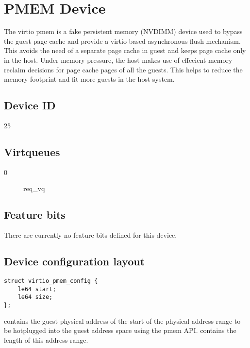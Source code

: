 \section{PMEM Device}\label{sec:Device Types / PMEM Device}

The virtio pmem is a fake persistent memory (NVDIMM) device
used to bypass the guest page cache and provide a virtio
based asynchronous flush mechanism. This avoids the need
of a separate page cache in guest and keeps page cache only
in the host. Under memory pressure, the host makes use of
effecient memory reclaim decisions for page cache pages
of all the guests. This helps to reduce the memory footprint
and fit more guests in the host system.

\subsection{Device ID}\label{sec:Device Types / PMEM Device / Device ID}
  25

\subsection{Virtqueues}\label{sec:Device Types / PMEM Device / Virtqueues}
\begin{description}
\item[0] req_vq
\end{description}

\subsection{Feature bits}\label{sec:Device Types / PMEM Device / Feature bits}

There are currently no feature bits defined for this device.

\subsection{Device configuration layout}\label{sec:Device Types / PMEM Device / Device configuration layout}

\begin{lstlisting}
struct virtio_pmem_config {
	le64 start;
	le64 size;
};
\end{lstlisting}

 contains the guest physical address of the start of the
physical address range to be hotplugged into the guest address space
using the pmem API.
 contains the length of this address range.

